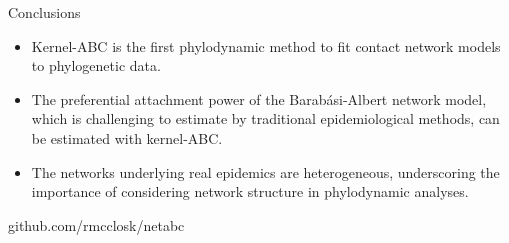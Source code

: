 \documentclass{beamer}
\begin{document}
\begin{frame}{Conclusions}
  \begin{itemize}
    \item Kernel-ABC is the first phylodynamic method to fit contact network
      models to phylogenetic data.
      \pause
    \item The preferential attachment power of the Barab\'asi-Albert network
      model, which is challenging to estimate by traditional epidemiological
      methods, can be estimated with kernel-ABC.
      \pause
    \item The networks underlying real epidemics are heterogeneous,
      underscoring the importance of considering network structure in
      phylodynamic analyses.
      \pause
  \end{itemize}
  \centerline{ github.com/rmcclosk/netabc}
\end{frame}
\end{document}
